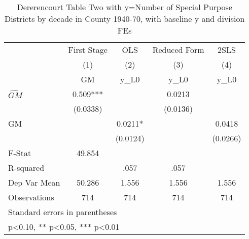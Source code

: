 \begin{table}[htbp]\centering
\def\sym#1{\ifmmode^{#1}\else\(^{#1}\)\fi}
\caption{Dererencourt Table Two with y=Number of Special Purpose Districts by decade in County 1940-70, with baseline y and division FEs}
\begin{tabular}{l*{4}{c}}
\toprule
                    & First Stage   &         OLS   &Reduced Form   &        2SLS   \\
                    &\multicolumn{1}{c}{(1)}&\multicolumn{1}{c}{(2)}&\multicolumn{1}{c}{(3)}&\multicolumn{1}{c}{(4)}\\
                    &\multicolumn{1}{c}{GM}&\multicolumn{1}{c}{y\_L0}&\multicolumn{1}{c}{y\_L0}&\multicolumn{1}{c}{y\_L0}\\
\midrule
$\hat{GM}$          &       0.509***&               &      0.0213   &               \\
                    &    (0.0338)   &               &    (0.0136)   &               \\
\addlinespace
GM                  &               &      0.0211*  &               &      0.0418   \\
                    &               &    (0.0124)   &               &    (0.0266)   \\
\midrule
F-Stat              &      49.854   &               &               &               \\
R-squared           &               &        .057   &        .057   &               \\
Dep Var Mean        &      50.286   &       1.556   &       1.556   &       1.556   \\
Observations        &         714   &         714   &         714   &         714   \\
\bottomrule
\multicolumn{5}{l}{\footnotesize Standard errors in parentheses}\\
\multicolumn{5}{l}{\footnotesize * p<0.10, ** p<0.05, *** p<0.01}\\
\end{tabular}
\end{table}
